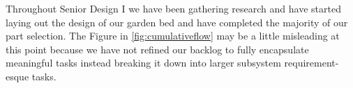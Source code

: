Throughout Senior Design I we have been gathering research and have started laying out the design of our garden bed and have completed the majority of our part selection. The Figure in \ref{fig:cumulativeflow} may be a little misleading at this point because we have not refined our backlog to fully encapsulate meaningful tasks instead breaking it down into larger subsystem requirement-esque tasks.

